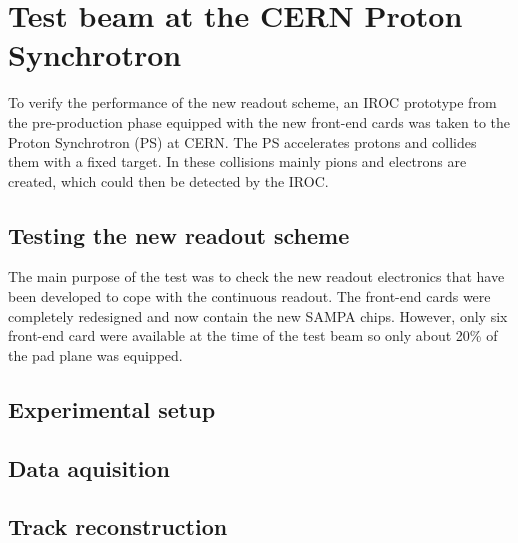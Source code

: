 \chapter{Test beam at the CERN Proton Synchrotron}
To verify the performance of the new readout scheme, an IROC prototype from the pre-production phase equipped with the new front-end cards was taken to the Proton Synchrotron (PS) at CERN. The PS accelerates protons and collides them with a fixed target. In these collisions mainly pions and electrons are created, which could then be detected by the IROC.
\section{Testing the new readout scheme}
The main purpose of the test was to check the new readout electronics that have been developed to cope with the continuous readout. The front-end cards were completely redesigned and now contain the new SAMPA chips. However, only six front-end card were available at the time of the test beam so only about 20\% of the pad plane was equipped. 
\section{Experimental setup}
\section{Data aquisition}
\section{Track reconstruction}